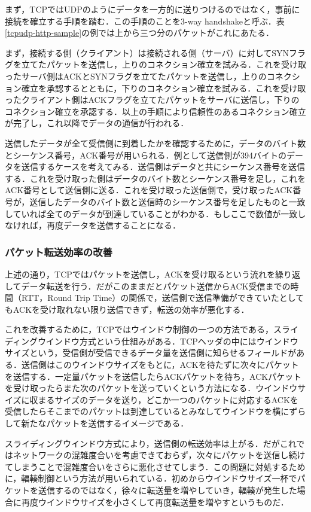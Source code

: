 まず，TCPではUDPのようにデータを一方的に送りつけるのではなく，事前に接続を確立する手順を踏む．この手順のことを3-way handshakeと呼ぶ．表\ref{tcpudp-http-sample}の例では上から三つ分のパケットがこれにあたる．

まず，接続する側（クライアント）は接続される側（サーバ）に対してSYNフラグを立てたパケットを送信し，上りのコネクション確立を試みる．これを受け取ったサーバ側はACKとSYNフラグを立てたパケットを送信し，上りのコネクション確立を承認するとともに，下りのコネクション確立を試みる．これを受け取ったクライアント側はACKフラグを立てたパケットをサーバに送信し，下りのコネクション確立を承認する．以上の手順により信頼性のあるコネクション確立が完了し，これ以降でデータの通信が行われる．

送信したデータが全て受信側に到着したかを確認するために，データのバイト数とシーケンス番号，ACK番号が用いられる．例として送信側が394バイトのデータを送信するケースを考えてみる．送信側はデータと共にシーケンス番号を送信する．これを受け取った側はデータのバイト数とシーケンス番号を足し，これをACK番号として送信側に送る．これを受け取った送信側で，受け取ったACK番号が，送信したデータのバイト数と送信時のシーケンス番号を足したものと一致していれば全てのデータが到達していることがわかる．もしここで数値が一致しなければ，再度データを送信することになる．

\subsubsection{パケット転送効率の改善}
上述の通り，TCPではパケットを送信し，ACKを受け取るという流れを繰り返してデータ転送を行う．だがこのままだとパケット送信からACK受信までの時間（RTT，Round Trip Time）の関係で，送信側で送信準備ができていたとしてもACKを受け取れない限り送信できず，転送の効率が悪化する．

これを改善するために，TCPではウインドウ制御の一つの方法である，スライディングウインドウ方式という仕組みがある．TCPヘッダの中にはウインドウサイズという，受信側が受信できるデータ量を送信側に知らせるフィールドがある．送信側はこのウインドウサイズをもとに，ACKを待たずに次々にパケットを送信する．一定量パケットを送信したらACKパケットを待ち，ACKパケットを受け取ったらまた次のパケットを送っていくという方法になる．ウインドウサイズに収まるサイズのデータを送り，どこか一つのパケットに対応するACKを受信したらそこまでのパケットは到達しているとみなしてウインドウを横にずらして新たなパケットを送信するイメージである．

スライディングウインドウ方式により，送信側の転送効率は上がる．だがこれではネットワークの混雑度合いを考慮できておらず，次々にパケットを送信し続けてしまうことで混雑度合いをさらに悪化させてしまう．この問題に対処するために，輻輳制御という方法が用いられている．初めからウインドウサイズ一杯でパケットを送信するのではなく，徐々に転送量を増やしていき，輻輳が発生した場合に再度ウインドウサイズを小さくして再度転送量を増やすというものだ．

